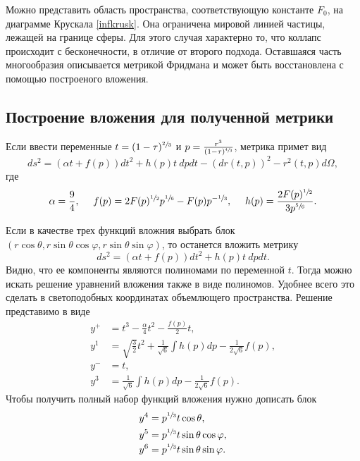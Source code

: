 \documentclass[12pt]{article}
\newcommand{\bq}{\begin{equation}}
\newcommand{\eq}{\end{equation}}
\begin{document}
Можно представить область пространства, соответствующую константе $F_0$, на диаграмме Крускала \ref{infkrusk}. Она ограничена мировой линией частицы, лежащей на границе сферы. Для этого случая характерно то, что коллапс происходит с бесконечности, в отличие от второго подхода. Оставшаяся часть многообразия описывается метрикой Фридмана и может быть восстановлена с помощью построеного вложения.

\subsection{Построение вложения для полученной метрики}

Если ввести переменные $t = (1-\tau)^{\sfrac{2}{3}}$ и $p = \frac{r^3}{(1-\tau)^{\sfrac{4}{3}}}$, метрика примет вид
\bq
	d s^2 = \left(\alpha t +f(p) \right) dt^2 + h(p) t \ dp dt - \left(dr(t,p)\right)^2 - r^2(t,p) d \Omega,
\eq
где 
\[
\alpha = \frac{9}{4},\ \ \ \  f(p) = 2 F(p)^{\sfrac{1}{2}} p^{\sfrac{1}{6}} - F(p) p^{-\sfrac{1}{3}}, \ \ \ \  h(p) = \frac{2F(p)^{\sfrac{1}{2}}}{3p^{\sfrac{5}{6}}}.
\]

Если в качестве трех функций вложния выбрать блок $(r \cos{\theta},r \sin{\theta}\cos{\varphi},r \sin{\theta}\sin{\varphi})$, то останется вложить метрику
\bq
	d s^2 = \left(\alpha t +f(p) \right) dt^2 + h(p) t \ dp dt.
\eq
Видно, что ее компоненты являются полиномами по переменной $t$. Тогда можно искать решение уравнений вложения также в виде полиномов. Удобнее всего это сделать в светоподобных координатах объемлющего пространства. Решение представимо в виде
\begin{align}
	y^{+} &= t^3 - \frac{\alpha}{4}t^2-\frac{f(p)}{2}t, \\
	y^1 &= \sqrt{\frac{3}{2}}t^2 + \frac{1}{\sqrt{6}}\int h(p)dp - \frac{1}{2\sqrt{6}}f(p), \\
	y^{-} &= t, \\
	y^{3} &= \frac{1}{\sqrt{6}}\int h(p)dp - \frac{1}{2\sqrt{6}}f(p).
\end{align}
Чтобы получить полный набор функций вложения нужно дописать блок
\begin{align}
	y^4 &= p^{\sfrac{1}{3}}t \cos{\theta}, \\
	y^5 &= p^{\sfrac{1}{3}}t \sin{\theta} \cos{\varphi}, \\
	y^6 &= p^{\sfrac{1}{3}}t\sin{\theta} \sin{\varphi}.
\end{align}
\end{document}
